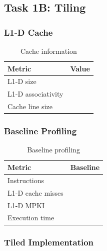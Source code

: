 
\subsection{Task 1B: Tiling}

\subsubsection{L1-D Cache}


\begin{table}[H]
\centering
\caption{Cache information}
\begin{tabular}{lc}
\toprule
Metric & Value \\
\midrule
L1-D size & \TODO{...} \\
L1-D associativity & \TODO{...} \\
Cache line size & \TODO{...} \\
\bottomrule
\end{tabular}
\end{table}


\subsubsection{Baseline Profiling}


\begin{table}[H]
\centering
\caption{Baseline profiling}
\begin{tabular}{lc}
\toprule
Metric & Baseline \\
\midrule
Instructions & \TODO{...} \\
L1-D cache misses & \TODO{...} \\
L1-D MPKI & \TODO{...} \\
Execution time & \TODO{...} \\
\bottomrule
\end{tabular}
\end{table}


\subsubsection{Tiled Implementation}

